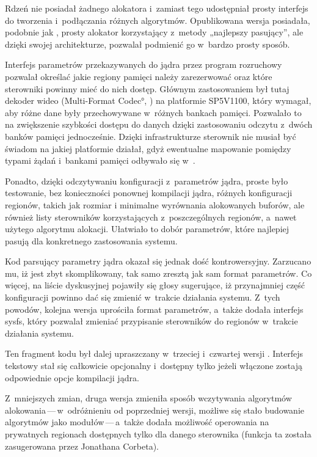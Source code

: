 Rdzeń  nie posiadał żadnego alokatora i~zamiast tego udostępniał
prosty interfejs do tworzenia i~podłączania różnych algorytmów.
Opublikowana wersja posiadała, podobnie jak , prosty alokator
korzystający z~metody „najlepszy pasujący”, ale dzięki swojej
architekturze,  pozwalał podmienić go w~bardzo prosty sposób.

Interfejs parametrów przekazywanych do jądra przez program rozruchowy
pozwalał określać jakie regiony pamięci należy zarezerwować oraz które
sterowniki powinny mieć do nich dostęp.  Głównym zastosowaniem był
tutaj dekoder wideo (\ang{Multi-Format Codec}, ) na
platformie SP5V1100, który wymagał, aby różne dane były przechowywane
w~różnych bankach pamięci.  Pozwalało to na zwiększenie szybkości
dostępu do danych dzięki zastosowaniu odczytu z~dwóch banków pamięci
jednocześnie.  Dzięki infrastrukturze  sterownik 
nie musiał być świadom na jakiej platformie działał, gdyż ewentualne
mapowanie pomiędzy typami żądań i~bankami pamięci odbywało się
w~.

Ponadto, dzięki odczytywaniu konfiguracji z~parametrów jądra, proste
było testowanie, bez konieczności ponownej kompilacji jądra, różnych
konfiguracji regionów, takich jak rozmiar i minimalne wyrównania
alokowanych buforów, ale również listy sterowników korzystających
z~poszczególnych regionów, a~nawet użytego algorytmu alokacji.
Ułatwiało to dobór parametrów, które najlepiej pasują dla konkretnego
zastosowania systemu.

Kod parsujący parametry jądra okazał się jednak dość kontrowersyjny.
Zarzucano mu, iż jest zbyt skomplikowany, tak samo zresztą jak sam
format parametrów.  Co więcej, na liście dyskusyjnej pojawiły się
głosy sugerujące, iż przynajmniej część konfiguracji powinno dać się
zmienić w~trakcie działania systemu.  Z~tych powodów, kolejna wersja
 uprościła format parametrów, a~także dodała interfejs sysfs, który
pozwalał zmieniać przypisanie sterowników do regionów w~trakcie
działania systemu.

Ten fragment kodu był dalej upraszczany w~trzeciej i~czwartej wersji
.  Interfejs tekstowy stał się całkowicie opcjonalny i~dostępny
tylko jeżeli włączone zostają odpowiednie opcje kompilacji jądra.

Z~mniejszych zmian, druga wersja zmieniła sposób wczytywania
algorytmów alokowania\,---\,w~odróżnieniu od poprzedniej wersji, możliwe
się stało budowanie algorytmów jako modułów\,---\,a~także dodała
możliwość operowania na prywatnych regionach dostępnych tylko dla
danego sterownika (funkcja ta została zasugerowana przez Jonathana
Corbeta).

